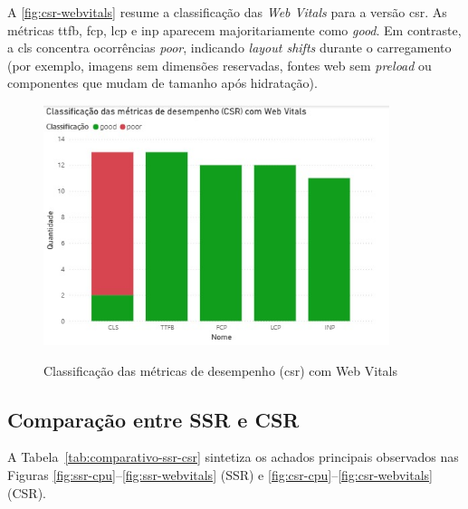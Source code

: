 A \autoref{fig:csr-webvitals} resume a classificação das \textit{Web Vitals} para a versão \acrshort{csr}. As métricas \acrshort{ttfb}, \acrshort{fcp}, \acrshort{lcp} e \acrshort{inp} aparecem majoritariamente como \textit{good}. Em contraste, a \acrshort{cls} concentra ocorrências \textit{poor}, indicando \textit{layout shifts} durante o carregamento (por exemplo, imagens sem dimensões reservadas, fontes web sem \textit{preload} ou componentes que mudam de tamanho após hidratação).

\begin{figure}[H]
  \centering
  \caption{Classificação das métricas de desempenho (\acrshort{csr}) com Web Vitals}
  \includegraphics[width=0.9\textwidth]{media/metricas_csr_web_vitals.jpeg}
  \label{fig:csr-webvitals}
\end{figure}

\subsection{Comparação entre SSR e CSR}
\label{subsec:comparacao-ssr-csr}

A Tabela~\ref{tab:comparativo-ssr-csr} sintetiza os achados principais observados nas Figuras \autoref{fig:ssr-cpu}--\autoref{fig:ssr-webvitals} (SSR) e \autoref{fig:csr-cpu}--\autoref{fig:csr-webvitals} (CSR).

